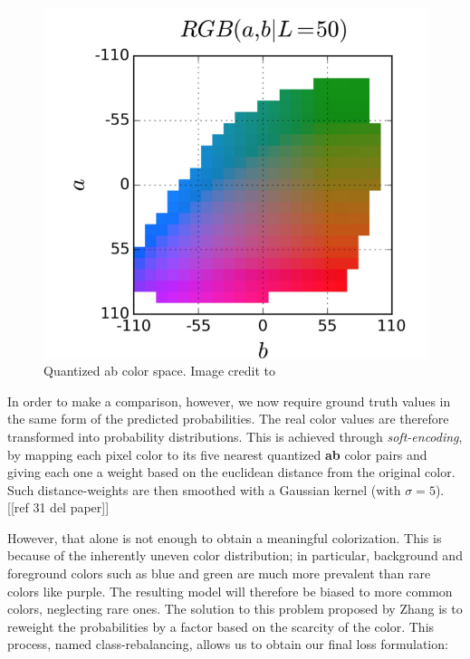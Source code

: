 \documentclass[twoside,twocolumn]{article}
\begin{document}
\begin{figure} [h]
	\includegraphics[width=\linewidth]{img/quantized.png}
	\caption{Quantized ab color space. Image credit to \cite{Zhang:2016}}
	\label{fig:quantized}
\end{figure}


In order to make a comparison, however, we now require ground truth values in the same form of the predicted probabilities. The real color values are therefore transformed into probability distributions. This is achieved through \textit{soft-encoding}, by mapping each pixel color to its five nearest quantized \textbf{ab} color pairs and giving each one a weight based on the euclidean distance from the original color. Such distance-weights are then smoothed with a Gaussian kernel (with $\sigma=5$). [[ref 31 del paper]]

However, that alone is not enough to obtain a meaningful colorization. This is because of the inherently uneven color distribution; in particular, background and foreground colors such as blue and green are much more prevalent than rare colors like purple. The resulting model will therefore be biased to more common colors, neglecting rare ones. 
The solution to this problem proposed by Zhang \cite{Zhang:2016} is to reweight the probabilities by a factor based on the scarcity of the color. This process, named class-rebalancing, allows us to obtain our final loss formulation:
\end{document}
